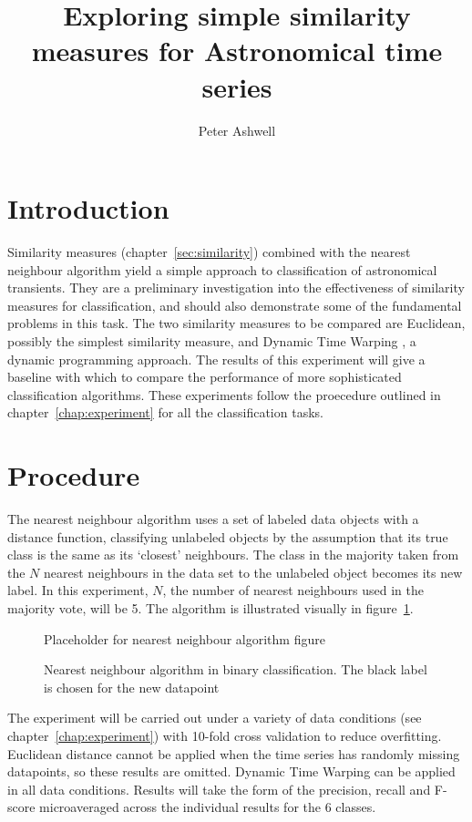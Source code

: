\documentclass[10pt]{article}
\title{Exploring simple similarity measures for Astronomical time series}
\author{Peter Ashwell}
\date{}
\begin{document}
	\maketitle
	
	\section{Introduction}
		\label{sec:introduction}
		Similarity measures (chapter~\ref{sec:similarity}) combined with the nearest neighbour algorithm yield a simple approach to classification of astronomical transients. They are a preliminary investigation into the effectiveness of similarity measures for classification, and should also demonstrate some of the fundamental problems in this task. The two similarity measures to be compared are Euclidean, possibly the simplest similarity measure, and Dynamic Time Warping \citep{berndt1994using}, a dynamic programming approach. The results of this experiment will give a baseline with which to compare the performance of more sophisticated classification algorithms. These experiments follow the proecedure outlined in chapter~\ref{chap:experiment} for all the classification tasks. 
	
	\section{Procedure}
		\label{sec:procedure}
		The nearest neighbour algorithm uses a set of labeled data objects with a distance function, classifying unlabeled objects by the assumption that its true class is the same as its `closest' neighbours. The class in the majority taken from the $N$ nearest neighbours in the data set to the unlabeled object becomes its new label. In this experiment, $N$, the number of nearest neighbours used in the majority vote, will be 5. The algorithm is illustrated visually in figure~\ref{fig:nearestneighbor}.
		
		\begin{figure}[ht!]
			\label{fig:nearestneighbor}
			\centering
			Placeholder for nearest neighbour algorithm figure
			\caption{Nearest neighbour algorithm in binary classification. The black label is chosen for the new datapoint}
		\end{figure}
		
		The experiment will be carried out under a variety of data conditions (see chapter~\ref{chap:experiment}) with 10-fold cross validation to reduce overfitting. Euclidean distance cannot be applied when the time series has randomly missing datapoints, so these results are omitted. Dynamic Time Warping can be applied in all data conditions. Results will take the form of the precision, recall and F-score microaveraged across the individual results for the 6 classes. 
\end{document}
